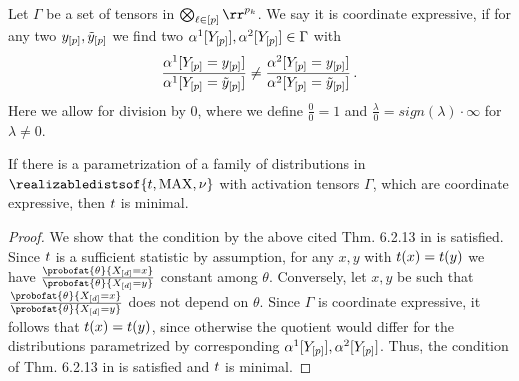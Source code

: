 \documentclass[aps,onecolumn,nofootinbib,pra]{article}
\begin{document}
    \begin{definition}
        Let $\Gamma$ be a set of tensors in $\bigotimes_{\selindexin}\rr^{\seldimof{\catenumerator}}$.
        We say it is coordinate expressive, if for any two $y_{[p]},\tilde{y}_{[p]}$ we find two $\alpha^{1}[Y_{[p]}],\alpha^{2}[Y_{[p]}]\in\Gamma$ with
        \begin{align*}
            \frac{\alpha^{1}[Y_{[p]}=y_{[p]}]}{\alpha^{1}[Y_{[p]}=\tilde{y}_{[p]}]} \neq
            \frac{\alpha^{2}[Y_{[p]}=y_{[p]}]}{\alpha^{2}[Y_{[p]}=\tilde{y}_{[p]}]} \, .
        \end{align*}
        Here we allow for division by $0$, where we define $\frac{0}{0}=1$ and $\frac{\lambda}{0}=sign(\lambda)\cdot\infty$ for $\lambda\neq 0$. %
    \end{definition}

    \begin{theorem}\label{the:coordinateExpressiveFollowsMinimal}
        If there is a parametrization of a family of distributions in $\realizabledistsof{\sstat,\maxgraph,\basemeasure}$ with activation tensors $\Gamma$, which are coordinate expressive, then $t$ is minimal.
    \end{theorem}
    \begin{proof}
        We show that the condition by the above cited Thm. 6.2.13 in \cite{casella_statistical_2001} is satisfied.
        Since $t$ is a sufficient statistic by assumption, for any $x,y$ with $t(x) = t(y)$ we have $ \frac{\probofat{\theta}{\shortcatvariables=x}}{\probofat{\theta}{\shortcatvariables=y}}$ constant among $\theta$.
        Conversely, let $x,y$ be such that $ \frac{\probofat{\theta}{\shortcatvariables=x}}{\probofat{\theta}{\shortcatvariables=y}}$ does not depend on $\theta$.
        Since $\Gamma$ is coordinate expressive, it follows that $t(x) = t(y)$, since otherwise the quotient would differ for the distributions parametrized by corresponding $\alpha^{1}[Y_{[p]}],\alpha^{2}[Y_{[p]}]$.
        Thus, the condition of Thm. 6.2.13 in \cite{casella_statistical_2001} is satisfied and $t$ is minimal.
    \end{proof}
\end{document}
